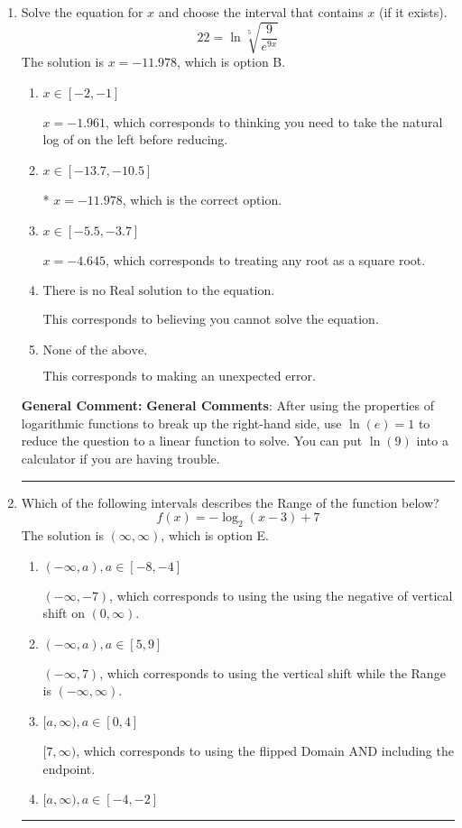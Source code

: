 \documentclass{extbook}[14pt]
\newcommand{\litem}[1]{\item #1

\rule{\textwidth}{0.4pt}}
\begin{document}
\begin{enumerate}\litem{
 Solve the equation for $x$ and choose the interval that contains $x$ (if it exists).
\[  22 = \ln{\sqrt[5]{\frac{9}{e^{9x}}}} \]The solution is \( x = -11.978 \), which is option B.\begin{enumerate}[label=\Alph*.]
\item \( x \in [-2, -1] \)

$x = -1.961$, which corresponds to thinking you need to take the natural log of on the left before reducing.
\item \( x \in [-13.7, -10.5] \)

* $x = -11.978$, which is the correct option.
\item \( x \in [-5.5, -3.7] \)

$x = -4.645$, which corresponds to treating any root as a square root.
\item \( \text{There is no Real solution to the equation.} \)

This corresponds to believing you cannot solve the equation.
\item \( \text{None of the above.} \)

This corresponds to making an unexpected error.
\end{enumerate}

\textbf{General Comment:} \textbf{General Comments}: After using the properties of logarithmic functions to break up the right-hand side, use $\ln(e) = 1$ to reduce the question to a linear function to solve. You can put $\ln(9)$ into a calculator if you are having trouble.
}
\litem{
Which of the following intervals describes the Range of the function below?
\[ f(x) = -\log_2{(x-3)}+7 \]The solution is \( (\infty, \infty) \), which is option E.\begin{enumerate}[label=\Alph*.]
\item \( (-\infty, a), a \in [-8, -4] \)

$(-\infty, -7)$, which corresponds to using the using the negative of vertical shift on $(0, \infty)$.
\item \( (-\infty, a), a \in [5, 9] \)

$(-\infty, 7)$, which corresponds to using the vertical shift while the Range is $(-\infty, \infty)$.
\item \( [a, \infty), a \in [0, 4] \)

$[7, \infty)$, which corresponds to using the flipped Domain AND including the endpoint.
\item \( [a, \infty), a \in [-4, -2] \)


\end{enumerate}}
\end{enumerate}
\end{document}
